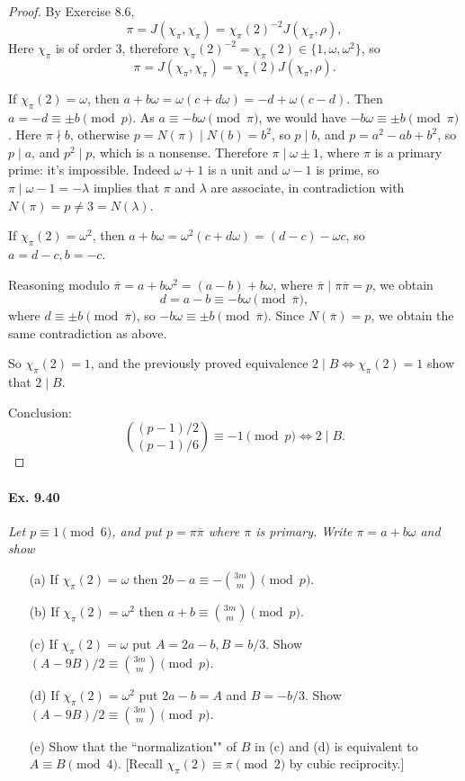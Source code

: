 \documentclass[11pt,a4paper]{article}
\begin{document}
\begin{proof}
By Exercise 8.6,
$$\pi = J(\chi_\pi,\chi_\pi) = \chi_\pi(2)^{-2} J (\chi_\pi,\rho),$$
Here $\chi_\pi$ is of order 3, therefore $\chi_\pi(2)^{-2} = \chi_\pi(2) \in \{1,\omega,\omega^2\}$, so
$$\pi = J(\chi_\pi,\chi_\pi) = \chi_\pi(2) J (\chi_\pi,\rho).$$

If $\chi_\pi(2) = \omega$, then $a+b\omega = \omega(c+d\omega) = -d + \omega(c-d)$. Then $a = -d \equiv \pm b \pmod p$. As $a \equiv -b\omega \pmod \pi$, we would have $-b\omega \equiv \pm b \pmod \pi$. Here $\pi \nmid b$,  otherwise $p = N(\pi) \mid N(b) = b^2$, so $p \mid b$, and $p =a^2 -ab +b^2$, so $p \mid a$, and $p^2 \mid p$, which is a nonsense. Therefore $\pi \mid \omega \pm 1$, where $\pi$ is a primary prime: it's impossible. Indeed $\omega + 1$ is a unit and $\omega - 1$ is prime, so $\pi \mid \omega - 1 = - \lambda$ implies that $\pi$ and $\lambda$ are associate, in contradiction with $N(\pi) = p \ne 3 = N(\lambda)$.

If $\chi_\pi(2) = \omega^2$, then $a+b\omega = \omega^2(c+d\omega) = (d-c) - \omega c$, so $a = d-c, b = -c$. 

Reasoning modulo $\overline{\pi} = a + b \omega^2 = (a-b) + b \omega$, where $\overline{\pi} \mid \pi \overline{\pi} =p$, we obtain
$$d = a-b \equiv -b \omega \pmod{\overline{\pi}},$$
where $d \equiv \pm b \pmod{\overline{\pi}}$, so $-b\omega \equiv \pm b\pmod{\overline{\pi}}$. Since $N(\overline{\pi}) = p$, we obtain the same contradiction as above.


So $\chi_\pi(2) = 1$, and the previously proved equivalence $2\mid B \iff \chi_\pi(2) = 1$ show that $2 \mid B$.

Conclusion: $$\binom{(p-1)/2}{(p-1)/6} \equiv -1 \pmod p \iff 2 \mid B.$$
\end{proof}

\paragraph{Ex. 9.40}
{\it Let $p\equiv 1 \pmod 6$, and put $p = \pi \overline{\pi}$ where $\pi$ is primary. Write $\pi = a + b\omega$ and show
\begin{enumerate}
\item[(a)] If $\chi_\pi(2) = \omega$ then $2b-a \equiv -\binom{3m}{m} \pmod p$.
\item[(b)] If $\chi_\pi(2) = \omega^2$ then $a+b \equiv \binom{3m}{m} \pmod p$.
\item[(c)] If $\chi_\pi(2) = \omega$ put $A=2a-b,B = b/3$. Show $(A-9B)/2 \equiv \binom{3m}{m} \pmod p$.
\item[(d)] If $\chi_\pi(2) = \omega^2$ put $2a-b = A$ and $B = -b/3$. Show $(A-9B)/2 \equiv \binom{3m}{m} \pmod p$.
\item[(e)] Show that the ``normalization"" of $B$ in (c) and (d) is equivalent to $A \equiv B \pmod 4$.
[Recall $\chi_\pi(2) \equiv \pi \pmod 2$ by cubic reciprocity.]
\end{enumerate}
}
\end{document}
